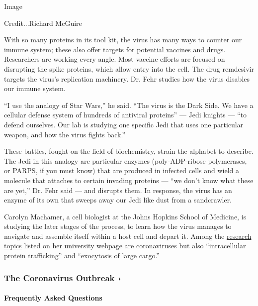 Image

Credit...Richard McGuire

With so many proteins in its tool kit, the virus has many ways to
counter our immune system; these also offer targets for
\href{https://www.nytimes.com/2020/04/30/health/coronavirus-antiviral-drugs.html}{potential
vaccines and drugs}. Researchers are working every angle. Most vaccine
efforts are focused on disrupting the spike proteins, which allow entry
into the cell. The drug remdesivir targets the virus's replication
machinery. Dr. Fehr studies how the virus disables our immune system.

``I use the analogy of Star Wars,'' he said. ``The virus is the Dark
Side. We have a cellular defense system of hundreds of antiviral
proteins'' --- Jedi knights --- ``to defend ourselves. Our lab is
studying one specific Jedi that uses one particular weapon, and how the
virus fights back.''

These battles, fought on the field of biochemistry, strain the alphabet
to describe. The Jedi in this analogy are particular enzymes
(poly-ADP-ribose polymerases, or PARPS, if you must know) that are
produced in infected cells and wield a molecule that attaches to certain
invading proteins --- ``we don't know what these are yet,'' Dr. Fehr
said --- and disrupts them. In response, the virus has an enzyme of its
own that sweeps away our Jedi like dust from a sandcrawler.

Carolyn Machamer, a cell biologist at the Johns Hopkins School of
Medicine, is studying the later stages of the process, to learn how the
virus manages to navigate and assemble itself within a host cell and
depart it. Among the
\href{https://cellbio.jhmi.edu/people/faculty/carolyn-machamer-phd}{research
topics} listed on her university webpage are coronaviruses but also
``intracellular protein trafficking'' and ``exocytosis of large cargo.''

\href{https://www.nytimes.com/news-event/coronavirus?action=click\&pgtype=Article\&state=default\&region=MAIN_CONTENT_3\&context=storylines_faq}{}

\hypertarget{the-coronavirus-outbreak-}{%
\subsubsection{The Coronavirus Outbreak
›}\label{the-coronavirus-outbreak-}}

\hypertarget{frequently-asked-questions}{%
\paragraph{Frequently Asked
Questions}\label{frequently-asked-questions}}

